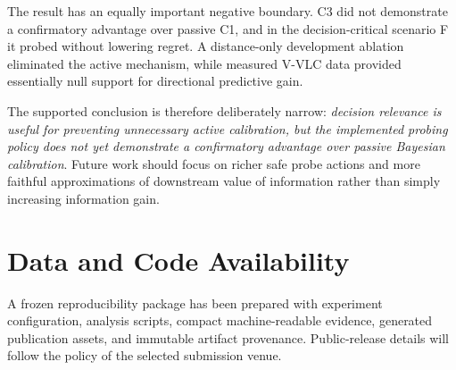 \documentclass[journal]{IEEEtran}
\begin{document}
The result has an equally important negative boundary. C3 did not demonstrate a confirmatory advantage over passive C1, and in the decision-critical scenario F it probed without lowering regret. A distance-only development ablation eliminated the active mechanism, while measured V-VLC data provided essentially null support for directional predictive gain.

The supported conclusion is therefore deliberately narrow: \emph{decision relevance is useful for preventing unnecessary active calibration, but the implemented probing policy does not yet demonstrate a confirmatory advantage over passive Bayesian calibration}. Future work should focus on richer safe probe actions and more faithful approximations of downstream value of information rather than simply increasing information gain.

\section*{Data and Code Availability}
A frozen reproducibility package has been prepared with experiment configuration, analysis scripts, compact machine-readable evidence, generated publication assets, and immutable artifact provenance. Public-release details will follow the policy of the selected submission venue.



\end{document}
